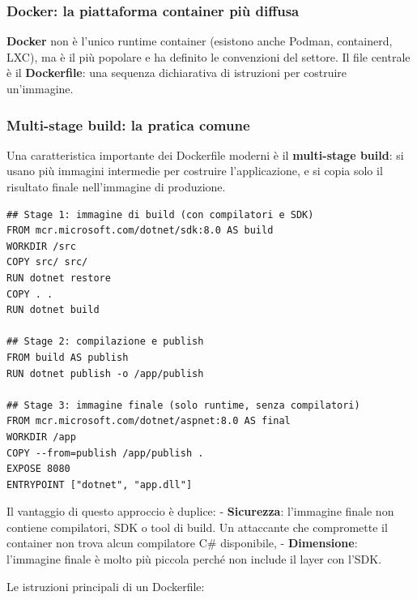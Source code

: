 \documentclass[
  italian,
  openany]{book}
\begin{document}
\subsubsection{Docker: la piattaforma container più
diffusa}\label{docker-la-piattaforma-container-piuxf9-diffusa}

\textbf{Docker} non è l'unico runtime container (esistono anche Podman,
containerd, LXC), ma è il più popolare e ha definito le convenzioni del
settore. Il file centrale è il \textbf{Dockerfile}: una sequenza
dichiarativa di istruzioni per costruire un'immagine.

\subsubsection{Multi-stage build: la pratica
comune}\label{multi-stage-build-la-pratica-comune}

Una caratteristica importante dei Dockerfile moderni è il
\textbf{multi-stage build}: si usano più immagini intermedie per
costruire l'applicazione, e si copia solo il risultato finale
nell'immagine di produzione.

\begin{verbatim}
## Stage 1: immagine di build (con compilatori e SDK)
FROM mcr.microsoft.com/dotnet/sdk:8.0 AS build
WORKDIR /src
COPY src/ src/
RUN dotnet restore
COPY . .
RUN dotnet build

## Stage 2: compilazione e publish
FROM build AS publish
RUN dotnet publish -o /app/publish

## Stage 3: immagine finale (solo runtime, senza compilatori)
FROM mcr.microsoft.com/dotnet/aspnet:8.0 AS final
WORKDIR /app
COPY --from=publish /app/publish .
EXPOSE 8080
ENTRYPOINT ["dotnet", "app.dll"]
\end{verbatim}

Il vantaggio di questo approccio è duplice: - \textbf{Sicurezza}:
l'immagine finale non contiene compilatori, SDK o tool di build. Un
attaccante che compromette il container non trova alcun compilatore C\#
disponibile, - \textbf{Dimensione}: l'immagine finale è molto più
piccola perché non include il layer con l'SDK.

Le istruzioni principali di un Dockerfile:
\end{document}
